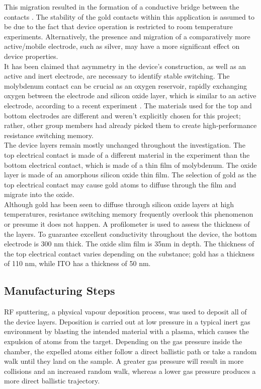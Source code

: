 \noindent This migration resulted in the formation of a conductive bridge between the contacts \cite{hirose1976polarity}. The stability of the gold contacts within this application is assumed to be due to the fact that device operation is restricted to room temperature experiments. Alternatively, the presence and migration of a comparatively more active/mobile electrode, such as silver, may have a more significant effect on device properties.\\

\noindent It has been claimed that asymmetry in the device's construction, as well as an active and inert electrode, are necessary to identify stable switching. The molybdenum contact can be crucial as an oxygen reservoir, rapidly exchanging oxygen between the electrode and silicon oxide layer, which is similar to an active electrode, according to a recent experiment \cite{cox2021nanoscale}. The materials used for the top and bottom electrodes are different and weren't explicitly chosen for this project; rather, other group members had already picked them to create high-performance resistance switching memory. \\

\noindent The device layers remain mostly unchanged throughout the investigation. The top electrical contact is made of a different material in the experiment than the bottom electrical contact, which is made of a thin film of molybdenum. The oxide layer is made of an amorphous silicon oxide thin film. The selection of gold as the top electrical contact may cause gold atoms to diffuse through the film and migrate into the oxide. \\

\noindent Although gold has been seen to diffuse through silicon oxide layers at high temperatures, resistance switching memory frequently overlook this phenomenon or presume it does not happen. A profilometer is used to assess the thickness of the layers. To guarantee excellent conductivity throughout the device, the bottom electrode is 300 nm thick. The oxide slim film is 35nm in depth. The thickness of the top electrical contact varies depending on the substance; gold has a thickness of 110 nm, while ITO has a thickness of 50 nm.

\subsection[Manufacturing Steps]{Manufacturing Steps}

\noindent RF sputtering, a physical vapour deposition process, was used to deposit all of the device layers. Deposition is carried out at low pressure in a typical inert gas environment by blasting the intended material with a plasma, which causes the expulsion of atoms from the target. Depending on the gas pressure inside the chamber, the expelled atoms either follow a direct ballistic path or take a random walk until they land on the sample. A greater gas pressure will result in more collisions and an increased random walk, whereas a lower gas pressure produces a more direct ballistic trajectory. \\

